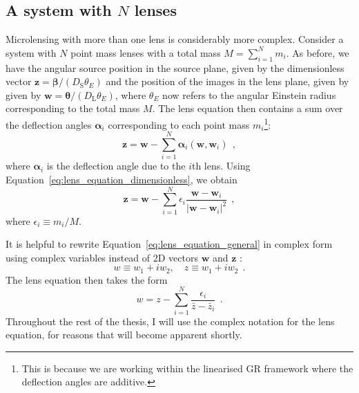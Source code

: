 \documentclass[12pt,dvipsnames]{report}
\renewcommand{\vec}[1]{\boldsymbol{\mathbf{#1}}}
\newcommand{\hquad}{~~}
\begin{document}
\subsection{A system with $N$ lenses}
\label{ssec:N_lenses}
Microlensing with more than one lens is considerably more complex. 
Consider a system with $N$ point mass lenses with a total
mass $M=\sum_{i=1}^Nm_i$. As before, we have the angular source position in the
source plane, given by the dimensionless vector
$\mathbf{z}=\boldsymbol\beta/(D_\textrm{S}\theta_E)$ and the position of the
images in the lens plane, given by given by
$\mathbf{w}=\boldsymbol\theta/(D_\textrm{L}\theta_E)$, where $\theta_E$ now
refers to the angular Einstein radius corresponding to the total mass $M$. The
lens equation then contains a sum over the deflection angles
$\boldsymbol\alpha_i$ corresponding to each point mass $m_i$\footnote{This is
    because we are working within the linearised GR framework where the deflection
    angles are additive.}:
\begin{equation}
    \mathbf{z}=\mathbf{w}-\sum_{i=1}^N\boldsymbol\alpha_i(\mathbf{w},\mathbf{w}_i)
    \hquad,
\end{equation}
where $\boldsymbol\alpha_i$ is the deflection angle due to the $i$th lens.
Using Equation~\ref{eq:lens_equation_dimensionless}, we obtain
\begin{equation}
    \mathbf{z}=\mathbf{w}-\sum_{i=1}^N\epsilon_i\frac{\mathbf{w}-\mathbf{w}_i}
    {\lvert \mathbf{w}-\mathbf{w}_i\rvert^2}
    \hquad,
    \label{eq:lens_equation_general}
\end{equation}
where $\epsilon_i\equiv m_i/M$.

It is helpful to rewrite Equation~\ref{eq:lens_equation_general} in complex form
using complex variables instead of 2D vectors $\vec w$ and $\vec z$
\citep{1990A&A...236..311W}:
\begin{equation}
    w\equiv w_1+iw_2,\quad z\equiv w_1+iw_2
    \hquad.
\end{equation}
The lens equation then takes the form
\begin{equation}
    w=z-\sum_{i=1}^N \frac{\epsilon_i}{\bar z-\bar z_i}
    \hquad.
    \label{eq:lens_equation_complex}
\end{equation}
Throughout the rest of the thesis, I will use the complex  notation for the lens
equation, for reasons that will become apparent shortly.
\end{document}

